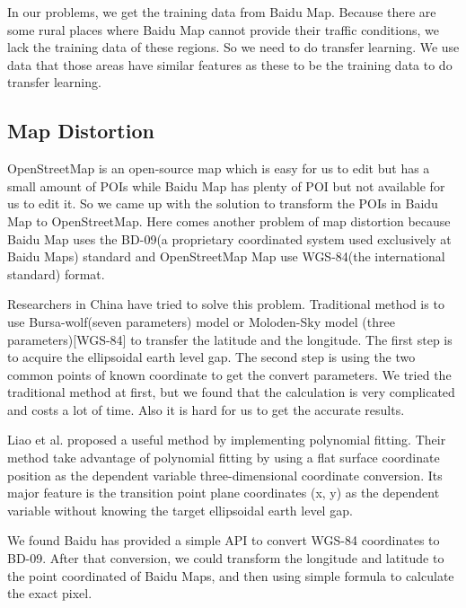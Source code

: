 In our problems, we get the training data from Baidu Map. Because there are some rural places where Baidu Map cannot provide their traffic conditions, we lack the training data of these regions. So we need to do transfer learning. We use data that those areas have similar features as these to be the training data to do transfer learning. 


\subsection{Map Distortion}
OpenStreetMap is an open-source map which is easy for us to edit but has a small amount of POIs while Baidu Map has plenty of POI but not available for us to edit it. So we came up with the solution to transform the POIs in Baidu Map to OpenStreetMap. Here comes another problem of map distortion because Baidu Map uses the BD-09(a proprietary coordinated system used exclusively at Baidu Maps) standard and OpenStreetMap Map use WGS-84(the international standard) format. 


Researchers in China have tried to solve this problem. Traditional method is to use Bursa-wolf(seven parameters) model or Moloden-Sky model (three parameters)[WGS-84] to transfer the latitude and the longitude. The first step is to acquire the ellipsoidal earth level gap. The second step is using the two common points of known coordinate to get the convert parameters. We tried the traditional method at first, but we found that the calculation is very complicated and costs a lot of time. Also it is hard for us to get the accurate results.

Liao et al.\cite{psh} proposed a useful method by implementing polynomial fitting. Their method take advantage of polynomial fitting by using a flat surface coordinate position as the dependent variable three-dimensional coordinate conversion. Its major feature is the transition point plane coordinates (x, y) as the dependent variable without knowing the target ellipsoidal earth level gap. 


We found Baidu has provided a simple API to convert WGS-84 coordinates to BD-09. After that conversion, we could transform the longitude and latitude to the point coordinated of Baidu Maps, and then using simple formula to calculate the exact pixel.
